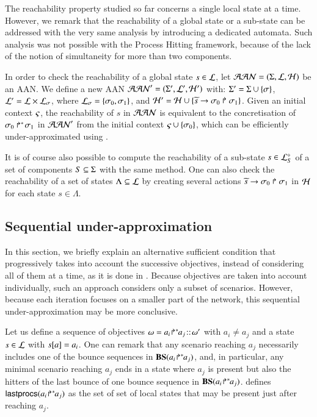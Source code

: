 The reachability property studied so far concerns a single local state at a time.
However, we remark that the reachability of a global state or a sub-state can be
addressed with the very same analysis by introducing a dedicated automata.
Such analysis was not possible with the Process Hitting framework,
because of the lack of the notion of simultaneity for more than two components.

In order to check the reachability of a global state $s \in \PHl$,
let $\PH = (\PHs, \PHl, \PHh)$ be an AAN.
We define a new AAN $\PH' = (\PHs', \PHl', \PHh')$ with:
$\PHs' = \PHs \cup \{ \reach \}$, $\PHl' = \PHl \times \PHl_\reach$,
where $\PHl_\reach = \{ \reach_0, \reach_1 \}$,
and $\PHh' = \PHh \cup \{ \PHhit{\toset{s}}{\reach_0}{\reach_1} \}$.
Given an initial context $\ctx$, the reachability of $s$ in $\PH$
is equivalent to the concretisation of $\PHobjp{\reach}{0}{1}$ in $\PH'$
from the initial context $\ctx \cup \{ \reach_0 \}$,
which can be efficiently under-approximated using .

It is of course also possible to compute the reachability
of a sub-state $s \in \PHsubl[\PHl]_S$ of a set of components $S \subseteq \PHs$
with the same method.
One can also check the reachability of a set of states $\Lambda \subseteq \PHl$
by creating several actions
$\PHhit{\toset{s}}{\reach_0}{\reach_1}$ in $\PHh$ for each state $s \in \Lambda$.



\subsection{Sequential under-approximation}
\label{ssec:ordered-ua}

In this section, we briefly explain an alternative sufficient condition that
progressively takes into account the successive objectives, instead of
considering all of them at a time, as it is done in .
Because objectives are taken into account individually, such an approach
considers only a subset of scenarios.
However, because each iteration focuses on a smaller part of the network, this
sequential under-approximation may be more conclusive.

Let us define a sequence of objectives $\w=\obj{a_i}{a_j}\concat\w'$ with
$a_i\neq a_j$ and a state $s\in \PHl$ with $\get{s}{a}=a_i$.
One can remark that any scenario reaching $a_j$ necessarily includes one of the
bounce sequences in $\BS(\obj{a_i}{a_j})$, and, in particular,
any minimal scenario reaching $a_j$ ends in a state where $a_j$ is present but
also the hitters of the last bounce of one bounce sequence in $\BS(\obj{a_i}{a_j})$.
 defines $\lastprocs(\obj{a_i}{a_j})$ as the set of set of
local states that may be present just after reaching $a_j$.

